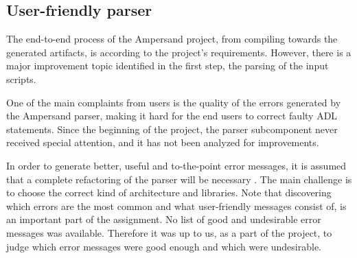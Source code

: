 
\subsection{User-friendly parser}
The end-to-end process of the Ampersand project, from compiling towards the generated artifacts, is according to the project's requirements.
However, there is a major improvement topic identified in the first step, the parsing of the input scripts.

One of the main complaints from users is the quality of the errors generated by the Ampersand parser, making it hard for the end users to correct faulty ADL statements.
Since the beginning of the project, the parser subcomponent never received special attention, and it has not been analyzed for improvements.

In order to generate better, useful and to-the-point error messages, it is assumed that a complete refactoring of the parser will be necessary \cite{project-description}.
The main challenge is to choose the correct kind of architecture and libraries.
Note that discovering which errors are the most common and what user-friendly messages consist of, is an important part of the assignment.
No list of good and undesirable error messages was available.
Therefore it was up to us, as a part of the project, to judge which error messages were good enough and which were undesirable.
